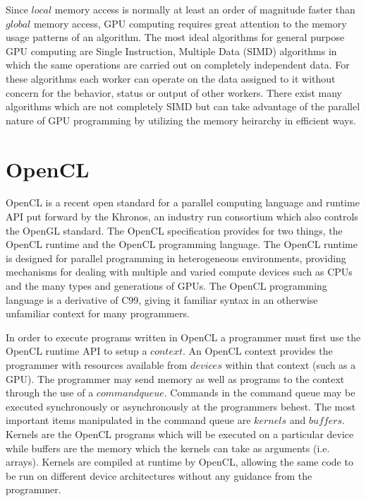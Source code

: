Since $local$ memory access is normally at least an
order of magnitude faster than $global$ memory access, GPU computing requires
great attention to the memory usage patterns of an algorithm. The most ideal
algorithms for general purpose GPU computing are Single Instruction, Multiple
Data (SIMD) algorithms in which the same operations are carried out on
completely independent data. For these algorithms each worker can operate on
the data assigned to it without concern for the behavior, status or output of
other workers. There exist many algorithms which are not completely SIMD but
can take advantage of the parallel nature of GPU programming by utilizing the
memory heirarchy in efficient ways.


\section{OpenCL}

OpenCL is a recent open standard for a parallel computing language and runtime
API put forward by the Khronos, an industry run consortium which also controls
the OpenGL standard.\cite{OpenCL} The OpenCL specification provides for two things, the
OpenCL runtime and the OpenCL programming language. The OpenCL runtime is
designed for parallel programming in heterogeneous environments, providing
mechanisms for dealing with multiple and varied compute devices such as CPUs
and the many types and generations of GPUs.  The OpenCL programming language is
a derivative of C99, giving it familiar syntax in an otherwise unfamiliar
context for many programmers.


In order to execute programs written in OpenCL a programmer must first use the
OpenCL runtime API to setup a $context$. An OpenCL context provides the
programmer with resources available from $devices$ within that context (such as
a GPU). The programmer may send memory as well as programs to the context
through the use of a $command queue$. Commands in the command queue may be
executed synchronously or asynchronously at the programmers behest. The most
important items manipulated in the command queue are $kernels$ and $buffers$.
Kernels are the OpenCL programs which will be executed on a particular device
while buffers are the memory which the kernels can take as arguments (i.e.
arrays). Kernels are compiled at runtime by OpenCL, allowing the same code to
be run on different device architectures without any guidance from the
programmer.


